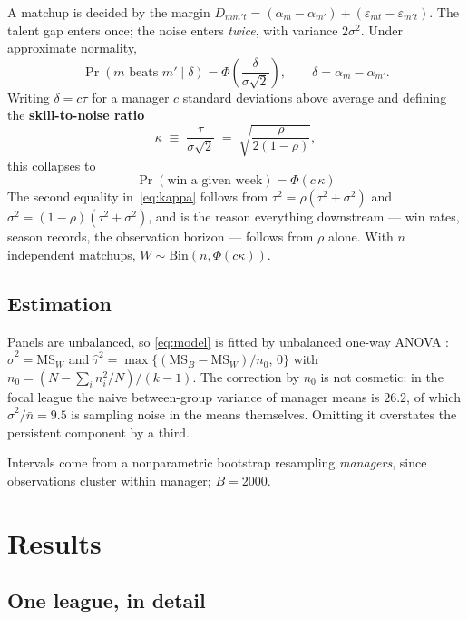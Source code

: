 \documentclass[11pt]{article}
\begin{document}
A matchup is decided by the margin
$D_{mm't} = (\alpha_m - \alpha_{m'}) + (\varepsilon_{mt} - \varepsilon_{m't})$.
The talent gap enters once; the noise enters \emph{twice}, with variance
$2\sigma^2$. Under approximate normality,
\begin{equation}
\Pr(m \text{ beats } m' \mid \delta) = \Phi\!\left(\frac{\delta}{\sigma\sqrt2}\right),
\qquad \delta = \alpha_m - \alpha_{m'} .
\end{equation}
Writing $\delta = c\tau$ for a manager $c$ standard deviations above average and
defining the \textbf{skill-to-noise ratio}
\begin{equation}
\kappa \;\equiv\; \frac{\tau}{\sigma\sqrt2} \;=\; \sqrt{\frac{\rho}{2(1-\rho)}},
\label{eq:kappa}
\end{equation}
this collapses to
\begin{equation}
\boxed{\;\Pr(\text{win a given week}) = \Phi(c\,\kappa)\;}
\label{eq:pk}
\end{equation}
The second equality in~\eqref{eq:kappa} follows from
$\tau^2 = \rho(\tau^2+\sigma^2)$ and $\sigma^2 = (1-\rho)(\tau^2+\sigma^2)$, and
is the reason everything downstream --- win rates, season records, the
observation horizon --- follows from $\rho$ alone. With $n$ independent
matchups, $W \sim \mathrm{Bin}(n, \Phi(c\kappa))$.

\subsection{Estimation}

Panels are unbalanced, so \eqref{eq:model} is fitted by unbalanced one-way ANOVA
\citep{searle1992}:
$\widehat\sigma^2 = \mathrm{MS}_W$ and
$\widehat\tau^2 = \max\{(\mathrm{MS}_B - \mathrm{MS}_W)/n_0,\,0\}$ with
$n_0 = (N - \sum_i n_i^2/N)/(k-1)$. The correction by $n_0$ is not cosmetic: in
the focal league the naive between-group variance of manager means is $26.2$, of
which $\widehat\sigma^2/\bar n = 9.5$ is sampling noise in the means themselves.
Omitting it overstates the persistent component by a third.

Intervals come from a nonparametric bootstrap resampling \emph{managers}, since
observations cluster within manager; $B=2000$.

\section{Results}

\subsection{One league, in detail}\label{sec:oneleague}
\end{document}
